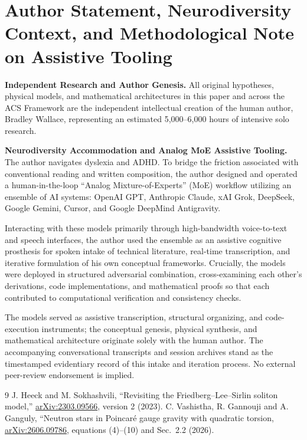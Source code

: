 \documentclass[11pt]{article}
\begin{document}
\section*{Author Statement, Neurodiversity Context, and Methodological Note on Assistive Tooling}
\noindent\textbf{Independent Research and Author Genesis.} 
All original hypotheses, physical models, and mathematical architectures in this paper and across the ACS Framework are the independent intellectual creation of the human author, Bradley Wallace, representing an estimated 5,000--6,000 hours of intensive solo research.

\vspace{0.5em}
\noindent\textbf{Neurodiversity Accommodation and Analog MoE Assistive Tooling.}
The author navigates dyslexia and ADHD. To bridge the friction associated with conventional reading and written composition, the author designed and operated a human-in-the-loop ``Analog Mixture-of-Experts'' (MoE) workflow utilizing an ensemble of AI systems: OpenAI GPT, Anthropic Claude, xAI Grok, DeepSeek, Google Gemini, Cursor, and Google DeepMind Antigravity.

Interacting with these models primarily through high-bandwidth voice-to-text and speech interfaces, the author used the ensemble as an assistive cognitive prosthesis for spoken intake of technical literature, real-time transcription, and iterative formulation of his own conceptual frameworks. Crucially, the models were deployed in structured adversarial combination, cross-examining each other's derivations, code implementations, and mathematical proofs so that each contributed to computational verification and consistency checks.

The models served as assistive transcription, structural organizing, and code-execution instruments; the conceptual genesis, physical synthesis, and mathematical architecture originate solely with the human author. The accompanying conversational transcripts and session archives stand as the timestamped evidentiary record of this intake and iteration process. No external peer-review endorsement is implied.

\begin{thebibliography}{9}
 J. Heeck and M. Sokhashvili,
``Revisiting the Friedberg--Lee--Sirlin soliton model,''
\href{https://arxiv.org/abs/2303.09566}{arXiv:2303.09566}, version 2 (2023).
 C. Vashistha, R. Gannouji and A. Ganguly,
``Neutron stars in Poincar\'e gauge gravity with quadratic torsion,
\href{https://arxiv.org/abs/2606.09786}{arXiv:2606.09786},
equations (4)--(10) and Sec.~2.2 (2026).
\end{thebibliography}
\end{document}
